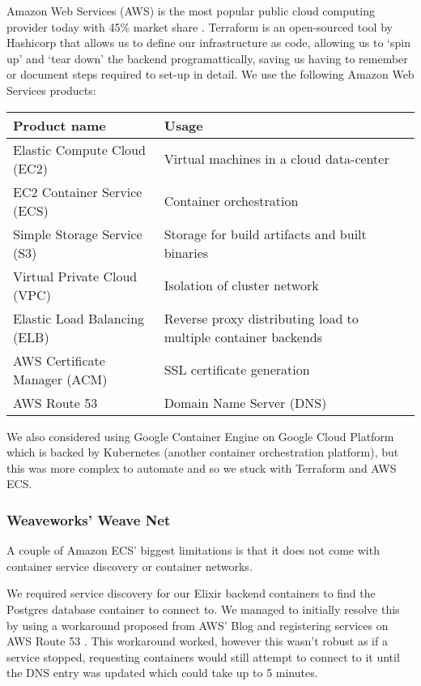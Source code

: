 \documentclass[11pt,a4paper]{report}
\begin{document}
Amazon Web Services (AWS) is the most popular public cloud computing provider today with 45\% market share \cite{website:talkincloud_cloud_share}. Terraform is an open-sourced tool by Hashicorp that allows us to define our infrastructure as code, allowing us to `spin up' and `tear down' the backend programattically, saving us having to remember or document steps required to set-up in detail. We use the following Amazon Web Services products:

\begin{tabular}{| l | p{6cm} |}
  \hline
  Product name & Usage \\
  \hline
  Elastic Compute Cloud (EC2) & Virtual machines in a cloud data-center\\
  EC2 Container Service (ECS) & Container orchestration \\
  Simple Storage Service (S3) & Storage for build artifacts and built binaries \\
  Virtual Private Cloud (VPC) & Isolation of cluster network\\
  Elastic Load Balancing (ELB) & Reverse proxy distributing load to multiple container backends\\
  AWS Certificate Manager (ACM) & SSL certificate generation\\
  AWS Route 53 & Domain Name Server (DNS)\\
  \hline
\end{tabular}

We also considered using Google Container Engine on Google Cloud Platform which is backed by Kubernetes (another container orchestration platform), but this was more complex to automate and so we stuck with Terraform and AWS ECS.

\subsubsection{Weaveworks' Weave Net}

A couple of Amazon ECS' biggest limitations is that it does not come with container service discovery or container networks.

We required service discovery for our Elixir backend containers to find the Postgres database container to connect to. We managed to initially resolve this by using a workaround proposed from AWS' Blog and registering services on AWS Route 53 \cite{website:aws_ecs_dns}. This workaround worked, however this wasn't robust as if a service stopped, requesting containers would still attempt to connect to it until the DNS entry was updated which could take up to 5 minutes.
\end{document}
